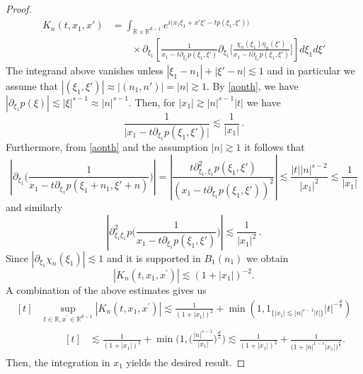 \documentclass[aihp]{imsart}
\numberwithin{equation}{section}
\theoremstyle{plain}
\theoremstyle{remark}
\newcommand{\R}{\mathbb{R}}
\begin{document}
\begin{proof}
\begin{align*}
K_n(t,x_1 ,x')
&= \int_{\R \times \R^{d-1}}  e^{i\big(x_1 \xi_1 +x' \xi'-t p (\xi_1, \xi') \big)} 
\\
&\qquad \times
\partial_{\xi_{1}} \left[ \frac{1}{x_1 - t\partial_{\xi_{1}}p(\xi_1, \xi')} 
\partial_{\xi_{1}}\Big[\frac{\chi_n(\xi_1) \eta_n (\xi')}{x_1 - t\partial_{\xi_{1}}p(\xi_1, \xi')} \Big]\right] d\xi_1 d\xi'
\end{align*}
The integrand above vanishes unless \(|\xi_{1}-n_{1}|+|\xi'-n|\lesssim1\) and in particular we assume that \(|(\xi_{1},\xi')|\approx|(n_{1},n')|=|n|\gtrsim1\).
By \eqref{aonth}, we have 
 $|\partial_{\xi_{1}}p(\xi)| \lesssim | \xi |^{s-1}\approx |n|^{s-1}$. Then, for  \(|x_{1}|\gtrsim|n|^{s-1}|t|\) we have 
\begin{equation*}
\frac{1}{\big|x_1 - t\partial_{\xi_{1}}p(\xi_1, \xi')\big|}\lesssim\frac{1}{|x_{1}|} \,.
\end{equation*}
Furthermore, from \eqref{aonth} and the assumption $|n| \gtrsim 1$ it follows that
\begin{equation*}
\left| \partial_{\xi_1} \Big( \frac{1}{x_1 - t\partial_{\xi_{1}}p(\xi_1+n_1, \xi' + n)} \Big) \right| =
\left| \frac{t\partial_{\xi_{1},\xi_{1}}^{2}p(\xi_1, \xi')}{(x_1 - t\partial_{\xi_{1}}p(\xi_1, \xi'))^2} \right|
\lesssim \frac{|t||n|^{s-2}}{|x_1|^{2}}
 \lesssim \frac{1}{|x_1|}
\end{equation*}
and similarly
$$
\left| \partial^2_{\xi_1\xi_1}p \Big( \frac{1}{x_1 - t\partial_{\xi_{1}}p(\xi_1, \xi')} \Big) \right|
 \lesssim \frac{1}{|x_1|^2} \,.
$$
Since $|\partial_{\xi_1} \chi_n(\xi_1)| \lesssim 1$ and it is supported in \(B_{1}(n_{1})\) we obtain
$$|K_n(t,x_1 ,x^\prime )|\lesssim    (1+ |x_1| )^{-2}.$$
A combination of the above estimates gives us
\begin{equation*}
\begin{aligned}[t]
&\sup_{t\in \R , x^\prime \in \R^{d-1}} |K_n (t,x_1, x^\prime)| \lesssim \frac{1}{(1+ |x_1|)^{2}}  +\min (1 , 1_{\{|x_1| \lesssim |n|^{s - 1} |t|\} }  |t|^{-\frac{d}{s}})
\\ & \qquad
\begin{aligned}[t]
& \lesssim \frac{1}{(1+ |x_1|)^{2}}  + \min \bigg(1 ,  \bigg(\frac{|n|^{s - 1}}{|x_1|}\bigg)^{\frac{d}{s} } \bigg)
\lesssim \frac{1}{(1+ |x_1|)^{2}}  +\frac{1}{\Big(1+|n|^{1-s}|x_1|\Big)^{\frac{d}{s}}}.
\end{aligned}
\end{aligned}
\end{equation*}
Then, the integration in $x_1$ yields the desired result.
\end{proof}
\end{document}
